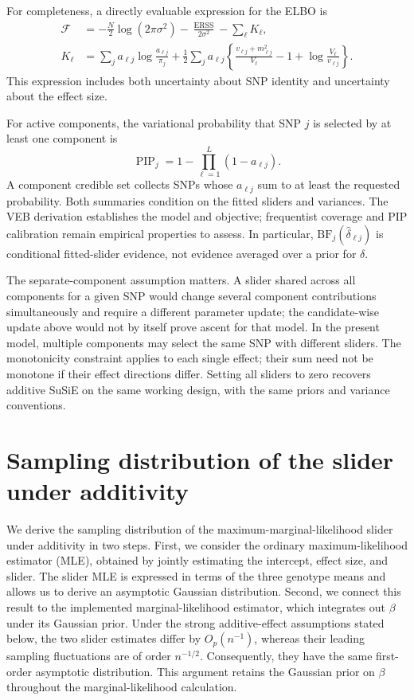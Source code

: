 \documentclass[11pt]{article}
\newcommand{\BF}{\mathrm{BF}}
\begin{document}
For completeness, a directly evaluable expression for the ELBO is
\begin{align}
\mathcal F
 &=-\frac N2\log(2\pi\sigma^2)
   -\frac{\operatorname{ERSS}}{2\sigma^2}
   -\sum_\ell K_\ell,\nonumber\\
K_\ell
 &=\sum_j a_{\ell j}\log\frac{a_{\ell j}}{\pi_j}
  +\frac12\sum_j a_{\ell j}
   \left\{\frac{v_{\ell j}+m_{\ell j}^2}{V_\ell}
                -1+\log\frac{V_\ell}{v_{\ell j}}\right\}.
\label{eq:veb-computable-elbo}
\end{align}
This expression includes both uncertainty about SNP identity and
uncertainty about the effect size.

For active components, the variational probability that SNP $j$
is selected by at least one component is
\begin{equation}
\operatorname{PIP}_j
  =1-\prod_{\ell=1}^L(1-a_{\ell j}).
\label{eq:veb-pip}
\end{equation}
A component credible set collects SNPs whose $a_{\ell j}$ sum to
at least the requested probability. Both summaries condition on
the fitted sliders and variances. The VEB derivation establishes
the model and objective; frequentist coverage and PIP calibration
remain empirical properties to assess. In particular,
$\BF_j(\widehat\delta_{\ell j})$ is conditional fitted-slider
evidence, not evidence averaged over a prior for $\delta$.

The separate-component assumption matters. A slider shared across
all components for a given SNP would change several component
contributions simultaneously and require a different parameter
update; the candidate-wise update above would not by itself prove
ascent for that model. In the present model, multiple components
may select the same SNP with different sliders. The monotonicity
constraint applies to each single effect; their sum need not be
monotone if their effect directions differ. Setting all sliders to
zero recovers additive SuSiE on the same working design, with the
same priors and variance conventions.


\section{Sampling distribution of the slider under additivity}
\label{sec:additive-sampling}

We derive the sampling distribution of the maximum-marginal-likelihood
slider under additivity in two steps. First, we consider the ordinary
maximum-likelihood estimator (MLE), obtained by jointly estimating the
intercept, effect size, and slider. The slider MLE is expressed in terms
of the three genotype means and allows us to derive an asymptotic
Gaussian distribution. Second, we connect this result to the implemented
marginal-likelihood estimator, which integrates out $\beta$ under
its Gaussian prior. Under the strong additive-effect assumptions
stated below, the two slider estimates differ by $O_p(n^{-1})$,
whereas their leading sampling fluctuations are of order
$n^{-1/2}$. Consequently, they have the same first-order asymptotic
distribution. This argument retains the Gaussian prior on $\beta$
throughout the marginal-likelihood calculation.
\end{document}
